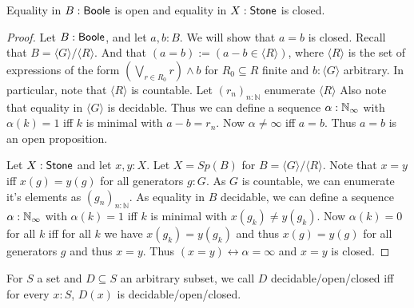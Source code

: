 \documentclass{../util/zariski-small}
\begin{document}
\begin{lemma}
  Equality in $B:\mathsf{Boole}$ is open and equality in $X:\mathsf{Stone}$ is closed. 
\end{lemma}
\begin{proof}
  Let $B:\mathsf{Boole}$, and let $a,b:B$. We will show that $a=b$ is closed. 
  Recall that $B = \langle G \rangle / \langle R \rangle$. 
  And that $(a=b):= (a-b \in \langle R \rangle)$, 
  where $\langle R \rangle$ is the set of expressions of the form
  $(\bigvee_{r\in R_0} r) \wedge b$ for $R_0\subseteq R$ finite and $b:\langle G \rangle$ 
  arbitrary. 
  In particular, note that $\langle R \rangle$ is countable. 
  Let $(r_n)_{n:\mathbb N}$ enumerate $ \langle R \rangle $
  Also note that equality in $\langle G \rangle$ is decidable. 
  Thus we can define a sequence $\alpha:\mathbb{N}_{\infty}$ with $\alpha(k) = 1$ iff $k$ is minimal with $a -b = r_n$. 
  Now $\alpha \neq \infty $ iff $a = b$. Thus $a=b$ is an open proposition. 

  Let $X:\mathsf{Stone}$ and let $x,y:X$. 
  Let $X= Sp(B)$ for $B = \langle G \rangle / \langle R \rangle $. 
  Note that $x=y$ iff $x(g) = y(g)$ for all generators $g:G$. 
  As $G$ is countable, we can enumerate it's elements as $(g_n)_{n:\mathbb N}$. 
  As equality in $B$ decidable, we can define a sequence $\alpha:\mathbb{N}_{\infty}$ 
  with $\alpha(k) = 1$ iff $k$ is minimal with $x(g_k) \neq y(g_k)$. 
  Now $\alpha(k) = 0$ for all $k$ iff for all $k$ we have $x(g_k) = y(g_k)$ and thus $x(g) = y(g)$ for all generators $g$ 
  and thus $ x= y$. 
  Thus $(x=y) \leftrightarrow \alpha= \infty$ and $ x=y$ is closed. 
\end{proof}


\begin{definition}
  For $S$ a set and $D\subseteq S$ an arbitrary subset, we call $D$ decidable/open/closed 
  iff for every $x:S$, $D(x)$ is decidable/open/closed. 
\end{definition}
\end{document}
